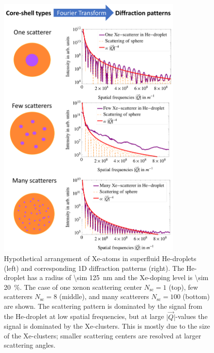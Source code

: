 \begin{figure}
 	\centering
 		\includegraphics[width=0.82\textwidth]{images/results/plum-pudding.png}
 	\caption[Hypothetical arrangement of Xe-clusters within He-droplets.]{Hypothetical arrangement of Xe-atoms in superfluid He-droplets (left) and corresponding 1D diffraction patterns (right). The He-droplet has a radius of \SI{\sim 125}{\nano\meter} and the Xe-doping level is \SI{\sim 20}{\percent}. The case of one xenon scattering center $N_{\text{sc}}=1$ (top), few scatterers $N_{\text{sc}}=8$ (middle), and many scatterers $N_{\text{sc}}=100$ (bottom) are shown. The scattering pattern is dominated by the signal from the He-droplet at low spatial frequencies, but at large $\lvert\vec{Q}\rvert$-values the signal is dominated by the Xe-clusters. This is mostly due to the size of the Xe-clusters; smaller scattering centers are resolved at larger scattering angles.}
 	\label{fig:HeXe-plum-pudding}
\end{figure}
